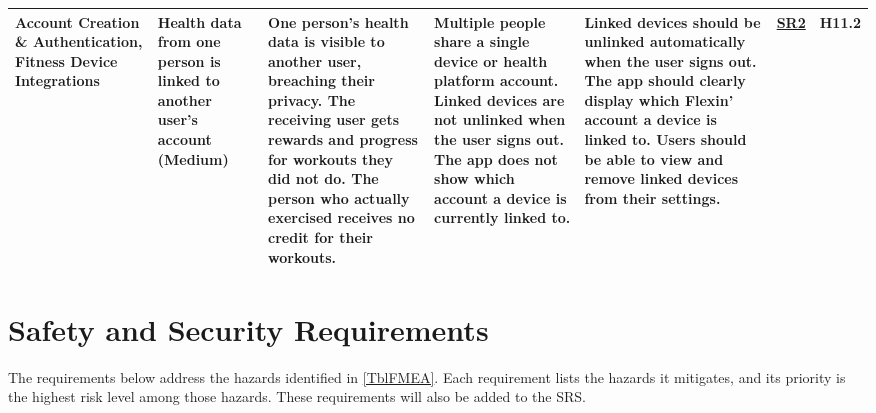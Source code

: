 \documentclass{article}
\begin{document}
\begin{landscape}
{\begin{longtable}{|p{2.5cm}|p{3cm}|p{3.8cm}|p{3.8cm}|p{5.5cm}|p{1.8cm}|p{1cm}|}
            \hline
            Account Creation \& Authentication, Fitness Device Integrations & Health data from one person is linked to another user's account (Medium) & \textbullet{} One person's health data is visible to another user, breaching their privacy. \newline \textbullet{} The receiving user gets rewards and progress for workouts they did not do. \newline \textbullet{} The person who actually exercised receives no credit for their workouts. & \textbullet{} Multiple people share a single device or health platform account. \newline \textbullet{} Linked devices are not unlinked when the user signs out. \newline \textbullet{} The app does not show which account a device is currently linked to. & \textbullet{} Linked devices should be unlinked automatically when the user signs out. \newline \textbullet{} The app should clearly display which Flexin' account a device is linked to. \newline \textbullet{} Users should be able to view and remove linked devices from their settings. & \hyperlink{sr2}{SR2} & H11.2 \\
            \hline
        \end{longtable}
    }
\end{landscape}
\restoregeometry

\section{Safety and Security Requirements}

The requirements below address the hazards identified in \autoref{TblFMEA}.
Each requirement lists the hazards it mitigates, and its priority is the highest risk level among those hazards.
These requirements will also be added to the SRS.
\end{document}
